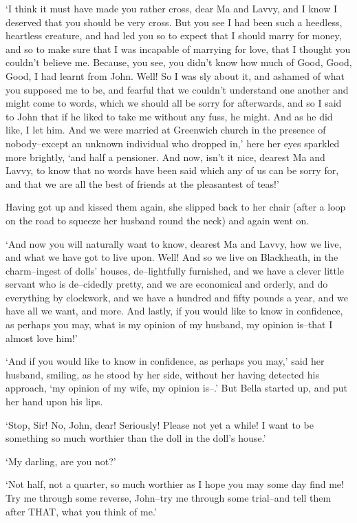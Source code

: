 ‘I think it must have made you rather cross, dear Ma and Lavvy, and I
know I deserved that you should be very cross. But you see I had been
such a heedless, heartless creature, and had led you so to expect that
I should marry for money, and so to make sure that I was incapable of
marrying for love, that I thought you couldn’t believe me. Because, you
see, you didn’t know how much of Good, Good, Good, I had learnt from
John. Well! So I was sly about it, and ashamed of what you supposed me
to be, and fearful that we couldn’t understand one another and might
come to words, which we should all be sorry for afterwards, and so I
said to John that if he liked to take me without any fuss, he might. And
as he did like, I let him. And we were married at Greenwich church in
the presence of nobody--except an unknown individual who dropped in,’
here her eyes sparkled more brightly, ‘and half a pensioner. And now,
isn’t it nice, dearest Ma and Lavvy, to know that no words have been
said which any of us can be sorry for, and that we are all the best of
friends at the pleasantest of teas!’

Having got up and kissed them again, she slipped back to her chair
(after a loop on the road to squeeze her husband round the neck) and
again went on.

‘And now you will naturally want to know, dearest Ma and Lavvy, how
we live, and what we have got to live upon. Well! And so we live on
Blackheath, in the charm--ingest of dolls’ houses, de--lightfully
furnished, and we have a clever little servant who is de--cidedly
pretty, and we are economical and orderly, and do everything by
clockwork, and we have a hundred and fifty pounds a year, and we
have all we want, and more. And lastly, if you would like to know in
confidence, as perhaps you may, what is my opinion of my husband, my
opinion is--that I almost love him!’

‘And if you would like to know in confidence, as perhaps you may,’
said her husband, smiling, as he stood by her side, without her having
detected his approach, ‘my opinion of my wife, my opinion is--.’ But
Bella started up, and put her hand upon his lips.

‘Stop, Sir! No, John, dear! Seriously! Please not yet a while! I want to
be something so much worthier than the doll in the doll’s house.’

‘My darling, are you not?’

‘Not half, not a quarter, so much worthier as I hope you may some
day find me! Try me through some reverse, John--try me through some
trial--and tell them after THAT, what you think of me.’

